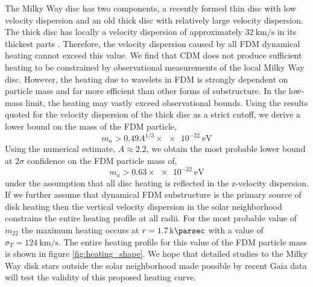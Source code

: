\documentclass[usenatbib]{mnras}
\begin{document}
The Milky Way disc has two components, a recently formed thin disc with low velocity dispersion and {\color{red} an} old thick disc with relatively large velocity dispersion. The thick disc has locally a velocity dispersion of approximately $\SI{32}{\kilo\meter\per\second}$ in its thickest parts \citep{milky_way}. Therefore, the velocity dispersion caused by all FDM dynamical heating cannot exceed this value. We find that CDM does not produce sufficient heating to be constrained by observational measurements of the local  Milky Way disc. However, the heating due to wavelets in FDM is strongly dependent on particle mass and far more efficient than other {\color{magenta} forms of substructure.} In the low-mass limit, the heating may vastly exceed observational bounds. Using the results quoted for the velocity dispersion of the thick disc as a strict cutoff, we derive a lower bound on the mass of the FDM particle,
\begin{equation}
m_a > 0.49 A^{1/3} \times \SI{e-22}{\electronvolt}
\end{equation}
Using the numerical estimate, $A \approx 2.2$, we obtain the most probable lower bound at $2 \sigma$ confidence on the FDM particle mass of,
\[ m_a > 0.63 \times \SI{e-22}{\electronvolt} \]
under the assumption that all disc heating is reflected in the z-velocity dispersion. If we further assume that dynamical FDM substructure is the primary source of disk heating then the vertical velocity dispersion in the solar neighborhood constrains the entire heating profile at all radii. For the most probable value of $m_{22}$ the maximum heating occurs at $r = \SI{1.7}{\kilo \parsec}$ with a value of $\sigma_{T} = \SI{124}{\kilo\meter\per\second}$. The entire heating profile for this value of the FDM particle mass is shown in figure \ref{fig:heating_shape}. We hope that detailed studies to the Milky Way disk stars outside the solar neighborhood made possible by recent Gaia data will test the validity of this proposed heating curve.   
\end{document}
